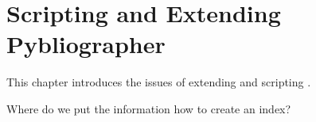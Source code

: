 
\chapter{Scripting and Extending Pybliographer}
\label{cha:pscript}

This chapter introduces the issues of extending and scripting \Pyb.

\begin{dnote}
\item  Where do we put the information how to create an index?
\end{dnote}


